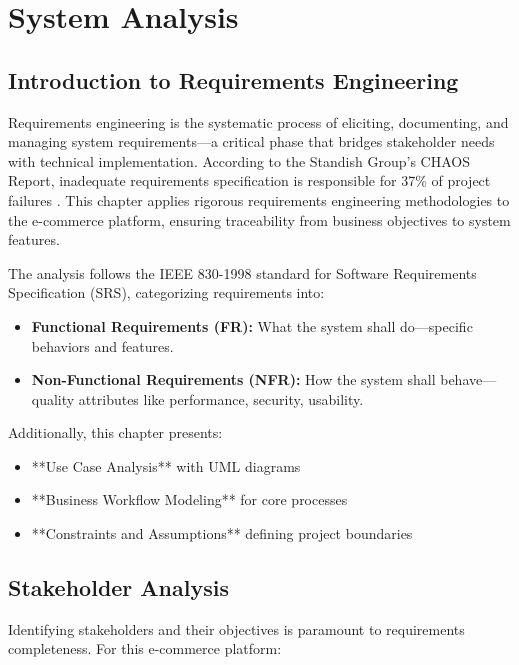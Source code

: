 
\chapter{System Analysis}

\section{Introduction to Requirements Engineering}

Requirements engineering is the systematic process of eliciting, documenting, and managing system requirements—a critical phase that bridges stakeholder needs with technical implementation. According to the Standish Group's CHAOS Report, inadequate requirements specification is responsible for 37\% of project failures \cite{standish2020}. This chapter applies rigorous requirements engineering methodologies to the e-commerce platform, ensuring traceability from business objectives to system features.

The analysis follows the IEEE 830-1998 standard for Software Requirements Specification (SRS), categorizing requirements into:

\begin{itemize}
    \item \textbf{Functional Requirements (FR):} What the system shall do—specific behaviors and features.
    \item \textbf{Non-Functional Requirements (NFR):} How the system shall behave—quality attributes like performance, security, usability.
\end{itemize}

Additionally, this chapter presents:
\begin{itemize}
    \item **Use Case Analysis** with UML diagrams
    \item **Business Workflow Modeling** for core processes
    \item **Constraints and Assumptions** defining project boundaries
\end{itemize}

\section{Stakeholder Analysis}

Identifying stakeholders and their objectives is paramount to requirements completeness. For this e-commerce platform:

